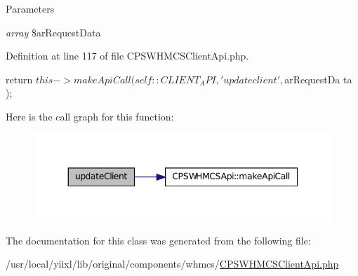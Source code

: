 \begin{DoxyParams}{Parameters}
\item[{\em array}]\$arRequestData \end{DoxyParams}


Definition at line 117 of file CPSWHMCSClientApi.php.




\begin{DoxyCode}
    {
        return $this->makeApiCall( self::CLIENT_API, 'updateclient', $arRequestDa
      ta );
    }
\end{DoxyCode}




Here is the call graph for this function:\nopagebreak
\begin{figure}[H]
\begin{center}
\leavevmode
\includegraphics[width=348pt]{classCPSWHMCSClientApi_a629cb6c4481550eb847f834e3010b78f_cgraph}
\end{center}
\end{figure}




The documentation for this class was generated from the following file:\begin{DoxyCompactItemize}
\item 
/usr/local/yiixl/lib/original/components/whmcs/\hyperlink{CPSWHMCSClientApi_8php}{CPSWHMCSClientApi.php}\end{DoxyCompactItemize}
